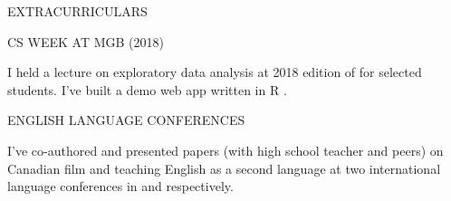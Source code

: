 \begin{minipage}[t]{\linewidth}\vspace{\sectionTopmargin}
{\titleFont\light EXTRACURRICULARS}\newline

\vspace{\titleBottomMargin}
{\subtitleFont\bold CS WEEK AT MGB \dateFont\extraLight(2018)}\newline
\newline

\vspace{-7mm}
{\contentFont I held a lecture on exploratory data analysis at 2018 edition of  for selected students. I've built a demo web app written in R .}
\end{minipage}
\newline%
%
\begin{minipage}[t]{\linewidth}\vspace{\subsectionSpace}
{\subtitleFont\bold ENGLISH LANGUAGE CONFERENCES}\newline
\newline

\vspace{-7mm}
{\contentFont I've co-authored and presented papers (with high school teacher and peers) on Canadian film and teaching English as a second language at two international language conferences in  and  respectively.}
\end{minipage}